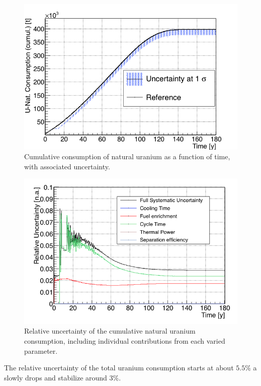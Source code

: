 \documentclass{anstrans}
\begin{document}
\begin{figure}[t] %
    \centering
    \includegraphics[scale=0.3]{unat_full}
    \caption{Cumulative consumption of natural uranium as a function of time, with
      associated uncertainty.}\label{fig:unat_full}
\end{figure}


\begin{figure}[t] %
    \centering
    \includegraphics[scale=0.3]{unat_uncer}
    \caption{Relative uncertainty of the cumulative natural uranium consumption, including
      individual contributions from each varied parameter.}\label{fig:unatr_uncer}
\end{figure}

The relative uncertainty of the total uranium consumption starts at about
$5.5\%$ a slowly drops and stabilize around $3\%$.
\end{document}
